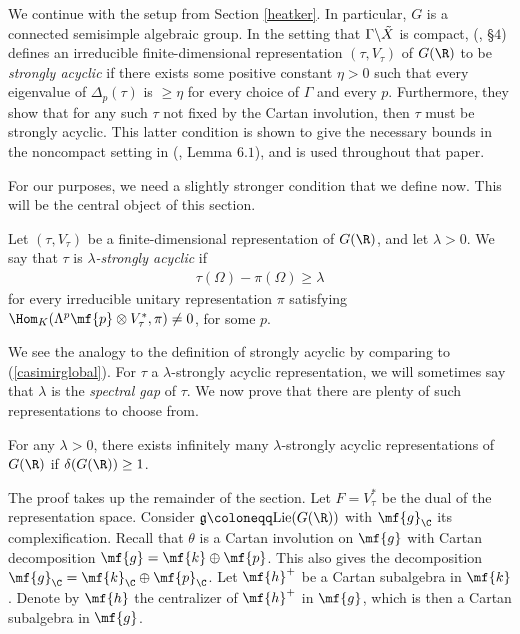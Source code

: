 \noindent We continue with the setup from Section \ref{heatker}. In particular, $G$ is a connected semisimple algebraic group. In the setting that $\Gamma\backslash\Tilde{X}$ is compact, (\cite{BV}, §$4$) defines an irreducible finite-dimensional representation $(\tau,V_\tau)$ of $G(\R)$ to be \textit{strongly acyclic} if there exists some positive constant $\eta>0$ such that every eigenvalue of $\Delta_p(\tau)$ is $\geq \eta$ for every choice of $\Gamma$ and every $p$. Furthermore, they show that for any such $\tau$ not fixed by the Cartan involution, then $\tau$ must be strongly acyclic. This latter condition is shown to give the necessary bounds in the noncompact setting in (\cite{MzM2}, Lemma $6.1$), and is used throughout that paper. 

For our purposes, we need a slightly stronger condition that we define now. This will be the central object of this section.
\begin{defn}
    Let $(\tau,V_\tau)$ be a finite-dimensional representation of $G(\R)$, and let $\lambda>0$. We say that $\tau$ is $\lambda$\textit{-strongly acyclic} if
    \begin{align*}
        \tau(\Omega)-\pi(\Omega) \geq \lambda
    \end{align*}
    for every irreducible unitary representation $\pi$ satisfying $\Hom_K(\Lambda^p\mf{p}\otimes V_\tau^*,\pi)\neq 0$, for some $p$.
\end{defn}
\noindent We see the analogy to the definition of strongly acyclic by comparing to (\ref{casimirglobal}). For $\tau$ a $\lambda$-strongly acyclic representation, we will sometimes say that $\lambda$ is the \textit{spectral gap} of $\tau$. We now prove that there are plenty of such representations to choose from.

\begin{prop}\label{kstrong}
    For any $\lambda>0$, there exists infinitely many $\lambda$-strongly acyclic representations of $G(\R)$ if $\delta(G(\R))\geq 1$.
\end{prop}

\noindent The proof takes up the remainder of the section. Let $F=V_\tau^*$ be the dual of the representation space. Consider $\mathfrak{g}\coloneqq \text{Lie}(G(\R))$ with $\mf{g}_\C$ its complexification. Recall that $\theta$ is a Cartan involution on $\mf{g}$ with Cartan decomposition $\mf{g}=\mf{k}\oplus\mf{p}$. This also gives the decomposition $\mf{g}_\C=\mf{k}_\C\oplus\mf{p}_\C$. Let $\mf{h}^+$ be a Cartan subalgebra in $\mf{k}$. Denote by $\mf{h}$ the centralizer of $\mf{h}^+$ in $\mf{g}$, which is then a Cartan subalgebra in $\mf{g}$.

